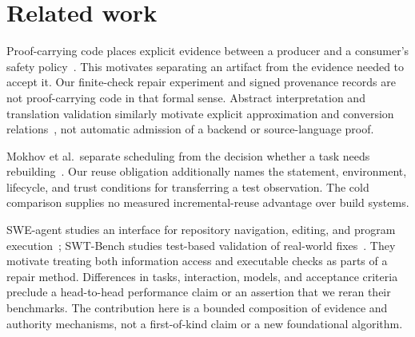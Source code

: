 \section{Related work}
\label{sec:related-work}

Proof-carrying code places explicit evidence between a producer and a
consumer's safety policy~\citep{baseline01}. This motivates separating an
artifact from the evidence needed to accept it. Our finite-check repair
experiment and signed provenance records are not proof-carrying code in
that formal sense. Abstract interpretation and translation validation
similarly motivate explicit approximation and conversion
relations~\citep{baseline02,baseline04}, not automatic admission of a backend
or source-language proof.

Mokhov et al.\ separate scheduling from the decision whether a task needs
rebuilding~\citep{baseline07}. Our reuse obligation additionally names the
statement, environment, lifecycle, and trust conditions for transferring a
test observation. The cold comparison supplies no measured incremental-reuse
advantage over build systems.

SWE-agent studies an interface for repository navigation, editing, and program
execution~\citep{baseline08}; SWT-Bench studies test-based validation of
real-world fixes~\citep{baseline11}. They motivate treating both information
access and executable checks as parts of a repair method. Differences in tasks,
interaction, models, and acceptance criteria preclude a head-to-head performance
claim or an assertion that we reran their benchmarks. The contribution here is
a bounded composition of evidence and authority mechanisms, not a first-of-kind
claim or a new foundational algorithm.

